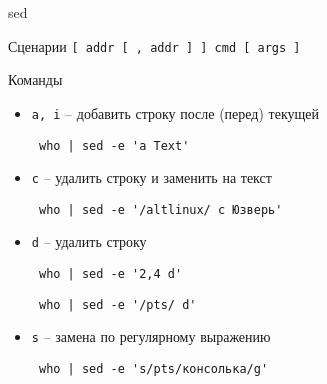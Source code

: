 \begin{frame}[fragile]{sed}
	\begin{block}{Сценарии}
		{\tt [ addr [ ,  addr ] ] cmd [ args ]}
	\end{block}

	\small
	\begin{block}{Команды}
		\begin{itemize}
		  \item {\tt a, i} -- добавить строку после (перед) текущей
			  \begin{verbatim} who | sed -e 'a Text' \end{verbatim}
		  \item {\tt c} -- удалить строку и заменить на текст
			  \begin{verbatim} who | sed -e '/altlinux/ c Юзверь' \end{verbatim}
		  \item {\tt d} -- удалить строку
			  \begin{verbatim} who | sed -e '2,4 d' \end{verbatim}
			  \begin{verbatim} who | sed -e '/pts/ d' \end{verbatim}
		  \item {\tt s} -- замена по регулярному выражению
			  \begin{verbatim} who | sed -e 's/pts/консолька/g' \end{verbatim}
		\end{itemize}
	\end{block}
\end{frame}



